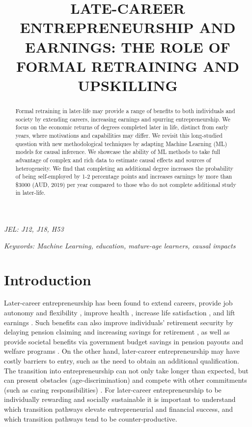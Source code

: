 \documentclass[12pt, a4paper]{article}
\title{LATE-CAREER ENTREPRENEURSHIP AND EARNINGS: THE ROLE OF FORMAL RETRAINING AND UPSKILLING}
\author{ }
\date{ }
\begin{document}

\maketitle


\begin{abstract}

Formal retraining in later-life may provide a range of benefits to both individuals and society by extending careers, increasing earnings and spurring entrepreneurship. We focus on the economic returns of degrees completed later in life, distinct from early years, where motivations and capabilities may differ. We revisit this long-studied question with new methodological techniques by adapting Machine Learning (ML) models for causal inference. We showcase the ability of ML methods to take full advantage of complex and rich data to estimate causal effects and sources of heterogeneity. We find that completing an additional degree increases the probability of being self-employed by 1-2 percentage points and increases earnings by more than \$3000 (AUD, 2019) per year compared to those who do not complete additional study in later-life. 

\end{abstract}


\emph{JEL: J12, J18, H53}

\emph{Keywords: Machine Learning, education, mature-age learners, causal impacts}

\clearpage
\doublespacing


\section{Introduction}

Later-career entrepreneurship has been found to extend careers, provide job autonomy and flexibility \citep{hundley2001}, improve health \citep{stephan2010}, increase life satisfaction \citep{parker2007, kautonen2017, lombard2001}, and lift earnings \citep{levine2017, astebro2014}. Such benefits can also improve individuals’ retirement security by delaying pension claiming and increasing savings for retirement \citep{kibler2012}, as well as provide societal benefits via government budget savings in pension payouts and welfare programs \citep{herneas2016, kautonen2017}. On the other hand, later-career entrepreneurship may have costly barriers to entry, such as the need to obtain an additional qualification. The transition into entrepreneurship can not only take longer than expected, but can present obstacles (age-discrimination) and compete with other commitments (such as caring responsibilities) \citep{kibler2012, weber2004}. For later-career entrepreneurship to be individually rewarding and socially sustainable it is important to understand which transition pathways elevate entrepreneurial and financial success, and which transition pathways tend to be counter-productive.
\end{document}
